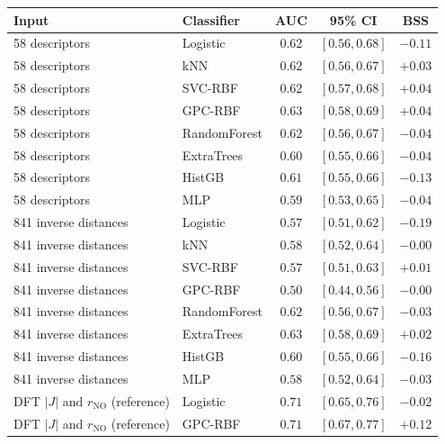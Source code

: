 \begin{tabular}{llccc}
\toprule
Input & Classifier & AUC & 95\% CI & BSS\\
\midrule
58 descriptors & Logistic & $0.62$ & $[0.56,0.68]$ & $-0.11$\\
58 descriptors & kNN & $0.62$ & $[0.56,0.67]$ & $+0.03$\\
58 descriptors & SVC-RBF & $0.62$ & $[0.57,0.68]$ & $+0.04$\\
58 descriptors & GPC-RBF & $0.63$ & $[0.58,0.69]$ & $+0.04$\\
58 descriptors & RandomForest & $0.62$ & $[0.56,0.67]$ & $-0.04$\\
58 descriptors & ExtraTrees & $0.60$ & $[0.55,0.66]$ & $-0.04$\\
58 descriptors & HistGB & $0.61$ & $[0.55,0.66]$ & $-0.13$\\
58 descriptors & MLP & $0.59$ & $[0.53,0.65]$ & $-0.04$\\
841 inverse distances & Logistic & $0.57$ & $[0.51,0.62]$ & $-0.19$\\
841 inverse distances & kNN & $0.58$ & $[0.52,0.64]$ & $-0.00$\\
841 inverse distances & SVC-RBF & $0.57$ & $[0.51,0.63]$ & $+0.01$\\
841 inverse distances & GPC-RBF & $0.50$ & $[0.44,0.56]$ & $-0.00$\\
841 inverse distances & RandomForest & $0.62$ & $[0.56,0.67]$ & $-0.03$\\
841 inverse distances & ExtraTrees & $0.63$ & $[0.58,0.69]$ & $+0.02$\\
841 inverse distances & HistGB & $0.60$ & $[0.55,0.66]$ & $-0.16$\\
841 inverse distances & MLP & $0.58$ & $[0.52,0.64]$ & $-0.03$\\
DFT $|J|$ and $r_\mathrm{NO}$ (reference) & Logistic & $0.71$ & $[0.65,0.76]$ & $-0.02$\\
DFT $|J|$ and $r_\mathrm{NO}$ (reference) & GPC-RBF & $0.71$ & $[0.67,0.77]$ & $+0.12$\\
\bottomrule
\end{tabular}
